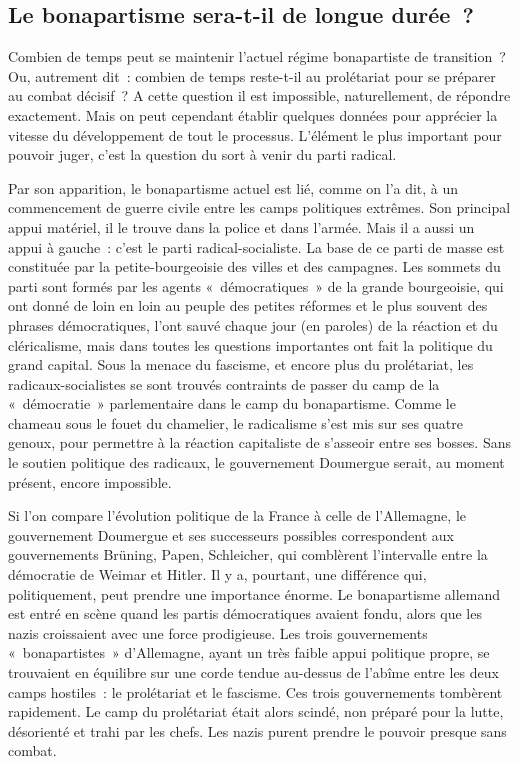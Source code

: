 \documentclass[french,twoside]{book} %
\begin{document}
\subsection[{Le bonapartisme sera-t-il de longue durée ?}]{Le bonapartisme sera-t-il de longue durée ?}
\noindent Combien de temps peut se maintenir l’actuel régime bonapartiste de transition ? Ou, autrement dit : combien de temps reste-t-il au prolétariat pour se préparer au combat décisif ? A cette question il est impossible, naturellement, de répondre exactement. Mais on peut cependant établir quelques données pour apprécier la vitesse du développement de tout le processus. L’élément le plus important pour pouvoir juger, c’est la question du sort à venir du parti radical.\par
 Par son apparition, le bonapartisme actuel est lié, comme on l’a dit, à un commencement de guerre civile entre les camps politiques extrêmes. Son principal appui matériel, il le trouve dans la police et dans l’armée. Mais il a aussi un appui à gauche : c’est le parti radical-socialiste. La base de ce parti de masse est constituée par la petite-bourgeoisie des villes et des campagnes. Les sommets du parti sont formés par les agents « démocratiques » de la grande bourgeoisie, qui ont donné de loin en loin au peuple des petites réformes et le plus souvent des phrases démocratiques, l’ont sauvé chaque jour (en paroles) de la réaction et du cléricalisme, mais dans toutes les questions importantes ont fait la politique du grand capital. Sous la menace du fascisme, et encore plus du prolétariat, les radicaux-socialistes se sont trouvés contraints de passer du camp de la « démocratie » parlementaire dans le camp du bonapartisme. Comme le chameau sous le fouet du chamelier, le radicalisme s’est mis sur ses quatre genoux, pour permettre à la réaction capitaliste de s’asseoir entre ses bosses. Sans le soutien politique des radicaux, le gouvernement Doumergue serait, au moment présent, encore impossible.\par
Si l’on compare l’évolution politique de la France à celle de l’Allemagne, le gouvernement Doumergue et ses successeurs possibles correspondent aux gouvernements Brüning, Papen, Schleicher, qui comblèrent l’intervalle entre la démocratie de Weimar et Hitler. Il y a, pourtant, une différence qui, politiquement, peut prendre une importance énorme. Le bonapartisme allemand est entré en scène quand les partis démocratiques avaient fondu, alors que les nazis croissaient avec une force prodigieuse. Les trois gouvernements « bonapartistes » d’Allemagne, ayant un très faible appui politique propre, se trouvaient en équilibre sur une corde tendue au-dessus de l’abîme entre les deux camps hostiles : le prolétariat et le  fascisme. Ces trois gouvernements tombèrent rapidement. Le camp du prolétariat était alors scindé, non préparé pour la lutte, désorienté et trahi par les chefs. Les nazis purent prendre le pouvoir presque sans combat.\par
\end{document}
